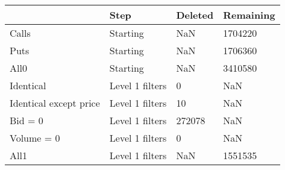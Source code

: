 \begin{tabular}{llll}
\toprule
 & Step & Deleted & Remaining \\
\midrule
Calls & Starting & NaN & 1704220 \\
Puts & Starting & NaN & 1706360 \\
All0 & Starting & NaN & 3410580 \\
Identical & Level 1 filters & 0 & NaN \\
Identical except price & Level 1 filters & 10 & NaN \\
Bid = 0 & Level 1 filters & 272078 & NaN \\
Volume = 0 & Level 1 filters & 0 & NaN \\
All1 & Level 1 filters & NaN & 1551535 \\
\bottomrule
\end{tabular}
